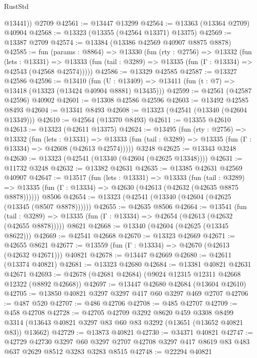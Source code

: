 \begin{lexlean}{RustStd}
\begin{coremodule}
        @13441))
    @2709
@42561 := @13447 @13299
@42564 := @13363 (@13364 @2709) @40904
@42568 := @13323 (@13355 (@42564 @13371) @13375)
@42569 := @13387 @2709
@42574 := @13384 (@13386 @42569 @40907 @8875 @8878)
@42585 := fun (params : @8864) =>
  @13330
    (fun (rty : @2756) =>
    @13332
      (fun (lets : @13331) =>
      @13333 (fun (tail : @3289) => @13335 (fun (Γ : @13334) => @42543 (@42568 @42574)))))
@42586 := @13329 @42585
@42587 := @13327 @42586
@42596 := @13410
    (fun (U : @13409) => @13411 (fun (t : @7) => @13418 (@13323 (@13424 @40904 @8881) @13435)))
@42599 := @42561 (@42587 @42596) @40902
@42601 := @13308 @42586 @42596
@42603 := @13492 @42585 @8493
@42604 := @13341 @8493
@42608 := @13323 (@42541 (@13340 (@42604 @13349)))
@42610 := @42564 (@13370 @8493)
@42611 := @13355 @42610
@42613 := @13323 (@42611 @13375)
@42624 := @13495
    (fun (rty : @2756) =>
    @13332
      (fun (lets : @13331) =>
      @13333 (fun (tail : @3289) => @13335 (fun (Γ : @13334) => @42608 (@42613 @42574)))))
    @3248
@42625 := @13343 @3248
@42630 := @13323 (@42541 (@13340 (@42604 (@42625 @13348))))
@42631 := @11732 @3248
@42632 := @13382 @42631
@42635 := @13385 @42631 @42569 @40907
@42647 := @13517
    (fun (lets : @13331) =>
    @13333
      (fun (tail : @3289) =>
      @13335 (fun (Γ : @13334) => @42630 (@42613 (@42632 (@42635 @8875 @8878))))))
    @8506
@42654 := @13323 (@42541 (@13340 (@42604 (@42625 (@13345 (@8507 @8878))))))
@42655 := @42635 @8506
@42664 := @13541
    (fun (tail : @3289) => @13335 (fun (Γ : @13334) => @42654 (@42613 (@42632 (@42655 @8878)))))
    @8621
@42668 := @13340 (@42604 (@42625 (@13345 @8622)))
@42669 := @42541 @42668
@42670 := @13323 @42669
@42671 := @42655 @8621
@42677 := @13559 (fun (Γ : @13334) => @42670 (@42613 (@42632 @42671))) @40821
@42678 := @13447 @42669
@42680 := @42611 (@13374 @40821)
@42681 := @13323 @42680
@42684 := @13381 @40821 @42631 @42671
@42693 := @42678 (@42681 @42684) (@9024 @12315 @12311 @42668 @12322 (@8892 @42668))
@42697 := @13447 @42680 @42684 (@13604 @42610)
@42705 := @13850 @40821 @3297 @3297 @417 @60 @3297 @469 @2707
@42706 := @487 @520
@42707 := @486 @42706
@42708 := @485 @42707
@42709 := @458 @42708
@42728 := @42705
    @42709
    @3292
    @8620
    @459
    @3308
    @8499
    @3314
    (@13643 @40821 @3297 @83 @60 @83 @3292 (@13651 (@13652 @40821 @83)) @13662)
@42729 := @13873 @40821
@42730 := @34371 @40821
@42747 := @42729
    @42730
    @3297
    @60
    @3297
    @2707
    @42708
    @3297
    @417
    @8619
    @83
    @483
    @637
    @2629
    @8512
    @3283
    @3283
    @8515
@42748 := @22294 @40821

\end{coremodule}
\end{lexlean}
